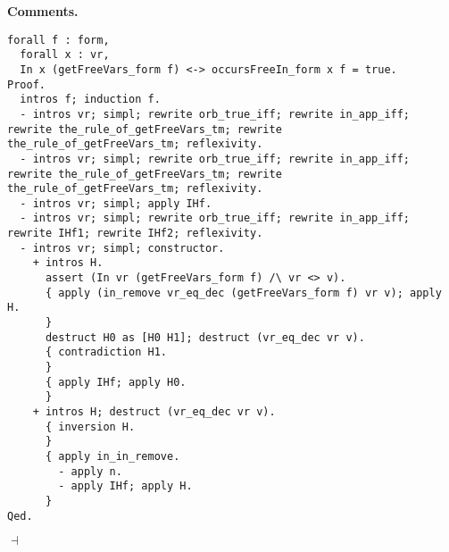 \documentclass[12pt]{paper}
\newenvironment{context}[1][]{\noindent \textbf{{#1}.}}{\hfill $ \dashv $}
\begin{document}
\begin{context}[Comments]
\begin{lstlisting}[frame=single]
  forall f : form,
  forall x : vr,
  In x (getFreeVars_form f) <-> occursFreeIn_form x f = true.
Proof.
  intros f; induction f.
  - intros vr; simpl; rewrite orb_true_iff; rewrite in_app_iff; rewrite the_rule_of_getFreeVars_tm; rewrite the_rule_of_getFreeVars_tm; reflexivity.
  - intros vr; simpl; rewrite orb_true_iff; rewrite in_app_iff; rewrite the_rule_of_getFreeVars_tm; rewrite the_rule_of_getFreeVars_tm; reflexivity.
  - intros vr; simpl; apply IHf.
  - intros vr; simpl; rewrite orb_true_iff; rewrite in_app_iff; rewrite IHf1; rewrite IHf2; reflexivity.
  - intros vr; simpl; constructor.
    + intros H.
      assert (In vr (getFreeVars_form f) /\ vr <> v).
      { apply (in_remove vr_eq_dec (getFreeVars_form f) vr v); apply H.
      }
      destruct H0 as [H0 H1]; destruct (vr_eq_dec vr v).
      { contradiction H1.
      }
      { apply IHf; apply H0.
      }
    + intros H; destruct (vr_eq_dec vr v).
      { inversion H.
      }
      { apply in_in_remove.
        - apply n.
        - apply IHf; apply H.
      }
Qed.
\end{lstlisting}


\end{context}
\end{document}
